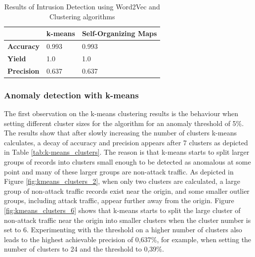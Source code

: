 \begin{table}[H]
	\caption{Results of Intrusion Detection using Word2Vec and Clustering algorithms}
	\label{tab:results}
	\begin{tabular}{|l|l|l|}
	\hline
					   & \textbf{k-means} & \textbf{Self-Organizing Maps} \\ \hline
	\textbf{Accuracy}  & 0.993            & 0.993                         \\ \hline
	\textbf{Yield}     & 1.0              & 1.0                           \\ \hline
	\textbf{Precision} & 0.637            & 0.637                         \\ \hline
	\end{tabular}
\end{table}

\subsubsection{Anomaly detection with k-means}
\label{subsubsec:anom_k_means}
The first observation on the k-means clustering results is the behaviour when setting different cluster sizes for the algorithm for an anomaly threshold of 5\%. The results show that after slowly increasing the number of clusters k-means calculates, a decay of accuracy and precision appears after 7 clusters as depicted in Table \ref{tab:k-means_clusters}. The reason is that k-means starts to split larger groups of records into clusters small enough to be detected as anomalous at some point and many of these larger groups are non-attack traffic. As depicted in Figure \ref{fig:kmeans_clusters_2}, when only two clusters are calculated, a large group of non-attack traffic records exist near the origin, and some smaller outlier groups, including attack traffic, appear further away from the origin. Figure \ref{fig:kmeans_clusters_6} shows that k-means starts to split the large cluster of non-attack traffic near the origin into smaller clusters when the cluster number is set to 6. Experimenting with the threshold on a higher number of clusters also leads to the highest achievable precision of 0,637\%, for example, when setting the number of clusters to 24 and the threshold to 0,39\%.


